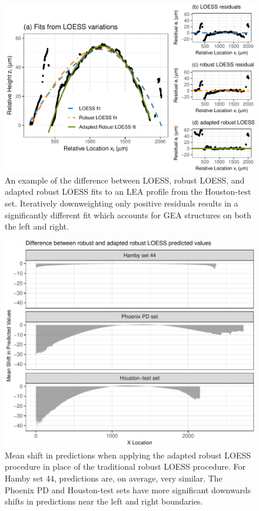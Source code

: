 \documentclass[12pt]{article}
\begin{document}
\begin{figure}
\centering
\includegraphics{writeup_files/figure-latex/houston-adapted-rlo-1.pdf}
\caption{\label{houston-adapted-rlo} An example of the difference
between LOESS, robust LOESS, and adapted robust LOESS fits to an LEA
profile from the Houston-test set. Iteratively downweighting only
positive residuals results in a significantly different fit which
accounts for GEA structures on both the left and right.}
\end{figure}

\begin{figure}
\centering
\includegraphics{writeup_files/figure-latex/adapted-rlo-shift-1.pdf}
\caption{\label{adapted-rlo-shift}Mean shift in predictions when
applying the adapted robust LOESS procedure in place of the traditional
robust LOESS procedure. For Hamby set 44, predictions are, on average,
very similar. The Phoenix PD and Houston-test sets have more significant
downwards shifts in predictions near the left and right boundaries.}
\end{figure}
\end{document}
